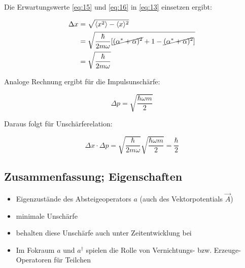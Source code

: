 Die Erwartungswerte \eqref{eq:15} und \eqref{eq:16} in \eqref{eq:13} einsetzen ergibt:

\begin{align}
  \label{eq:17}
  \Delta x &= \sqrt{ \langle x^2\rangle -\langle x\rangle^2 }  \notag\\
 &=\sqrt{\frac{\hbar}{2m\omega}[\cancel{( \alpha^*+\alpha)^2} + 1 - \cancel{ (\alpha^* + \alpha)^2}  ]} \notag\\
 &=\sqrt{\frac{\hbar}{2m\omega}}
\end{align}

Analoge Rechnung ergibt für die Impulsunschärfe:

\begin{equation}
  \label{eq:18}
  \Delta p = \sqrt{\frac{\hbar \omega m}{2}}
\end{equation}

Daraus folgt für Unschärferelation:

\begin{equation}
  \label{eq:19}
  \Delta x\cdot\Delta p = \sqrt{\frac{\hbar}{2m\omega}} \sqrt{\frac{\hbar \omega m}{2}} = \frac{\hbar}{2}
\end{equation}


\subsection*{Zusammenfassung; Eigenschaften}

\begin{itemize}
\item Eigenzustände des Absteigeoperators \(a\) (auch des Vektorpotentials \(\vec A\))
\item minimale Unschärfe
\item behalten diese Unschärfe auch unter Zeitentwicklung bei
\item Im Fokraum \(a\) und \(a^\dagger\) spielen die Rolle von Vernichtungs- bzw. Erzeuge-Operatoren für Teilchen
\end{itemize}


